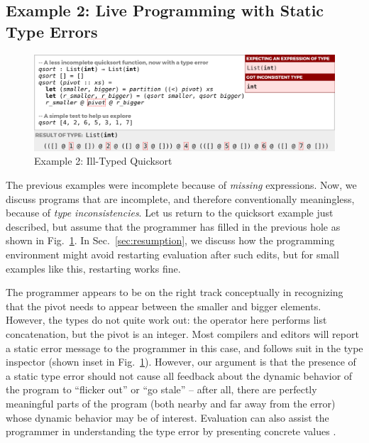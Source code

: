 

\subsection{Example 2: Live Programming with Static Type Errors}
\label{sec:static-errors}


\begin{figure}
\centering
\includegraphics[width=\textwidth,interpolate=false,valign=t]{images/qsort-type-error-inset.png}
\vspace{2px}
\caption{Example 2: Ill-Typed Quicksort}
\label{fig:qsort-type-error}
\vspace{-4px}
\end{figure}


The previous examples were incomplete 
because of \emph{missing} expressions.
%
Now, we discuss programs that are incomplete, 
and therefore conventionally meaningless, because of
\emph{type inconsistencies}. 
%
Let us return to the quicksort example just described, 
but assume that the programmer has filled in the previous hole
as shown in Fig.~\ref{fig:qsort-type-error}. In Sec.~\ref{sec:resumption}, we discuss
how the programming environment might avoid restarting evaluation after such edits, but for small examples like this, restarting works fine.

The programmer appears to be on the right track conceptually
in recognizing that the pivot needs to appear between the 
smaller and bigger elements. 
However, the types do not quite work out: the  operator here
performs list concatenation, but the pivot is an integer. 
Most compilers and editors will report a static error message
to the programmer in this case, and \Hazel 
follows suit in the type inspector (shown inset in Fig.~\ref{fig:qsort-type-error}). 
However, our argument is that the presence of a static type error should not cause all feedback about 
the dynamic behavior of the program to ``flicker out'' or ``go stale'' --
after all, there are perfectly meaningful parts of the program (both nearby
and far away from the error) 
whose dynamic behavior may be of interest. Evaluation can also assist the programmer in understanding the type error by presenting concrete values \cite{Seidel2016}.

